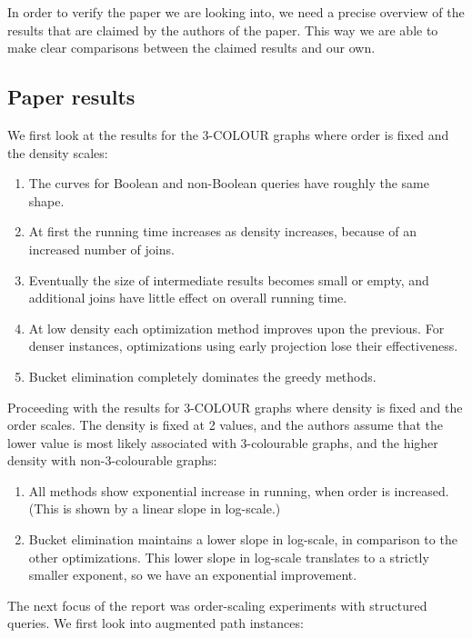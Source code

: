 In order to verify the paper we are looking into, we need a precise overview of the results that are claimed by the authors of the paper. This way we are able to make clear comparisons between the claimed results and our own.

\subsection{Paper results}
We first look at the results for the 3-COLOUR graphs where order is fixed and the density scales:
\begin{enumerate}
	\item \label{claim:Curve} The curves for Boolean and non-Boolean queries have roughly the same shape.
	\item \label{claim:RunInc} At first the running time increases as density increases, because of an increased number of joins.
	\item \label{claim:SizeInter} Eventually the size of intermediate results becomes small or empty, and additional joins have little effect on overall running time.
	\item \label{claim:IncImprov} At low density each optimization method improves upon the previous. For denser instances, optimizations using early projection lose their effectiveness.
	\item \label{claim:BucketDominates} Bucket elimination completely dominates the greedy methods.
\end{enumerate}

\noindent Proceeding with the results for 3-COLOUR graphs where density is fixed and the order scales. The density is fixed at 2 values, and the authors assume that the lower value is most likely associated with 3-colourable graphs, and the higher density with non-3-colourable graphs:

\begin{enumerate}[resume]
	\item \label{claim:ExpoInc} All methods show exponential increase in running, when order is increased. (This is shown by a linear slope in log-scale.)
	\item \label{claim:BucketExpoImpr} Bucket elimination maintains a lower slope in log-scale, in comparison to the other optimizations. This lower slope in log-scale translates to a strictly smaller exponent, so we have an exponential improvement.
\end{enumerate}

\noindent The next focus of the report was order-scaling experiments with structured queries. We first look into augmented path instances:

